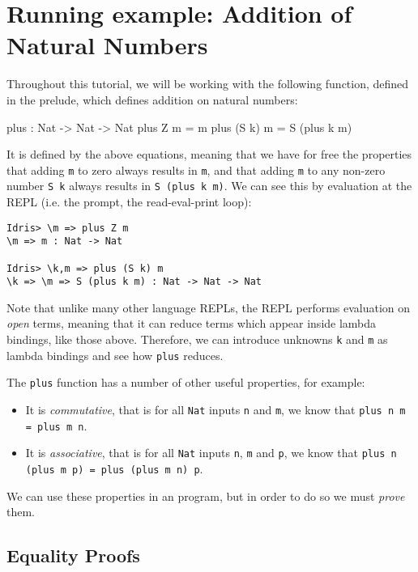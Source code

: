 \section{Running example: Addition of Natural Numbers}

Throughout this tutorial, we will be working with the following function,
defined in the \Idris{} prelude, which defines addition on natural numbers:

\begin{code}
plus : Nat -> Nat -> Nat
plus Z     m = m
plus (S k) m = S (plus k m)
\end{code}

\noindent
It is defined by the above equations, meaning that we have for free the
properties that adding \texttt{m} to zero always results in \texttt{m},
and that adding \texttt{m} to any non-zero number \texttt{S k} always results
in \texttt{S (plus k m)}. We can see this by evaluation at the \Idris{}
REPL (i.e. the prompt, the read-eval-print loop):

\begin{lstlisting}[style=stdout]
Idris> \m => plus Z m
\m => m : Nat -> Nat

Idris> \k,m => plus (S k) m
\k => \m => S (plus k m) : Nat -> Nat -> Nat
\end{lstlisting}

\noindent
Note that unlike many other language REPLs, the \Idris{} REPL performs
evaluation on \emph{open} terms, meaning that it can reduce terms which appear
inside lambda bindings, like those above. Therefore, we can introduce unknowns
\texttt{k} and \texttt{m} as lambda bindings and see how \texttt{plus}
reduces.

The \texttt{plus} function has a number of other useful properties, for
example:

\begin{itemize}
\item It is \emph{commutative}, that is for all \texttt{Nat} inputs
\texttt{n} and \texttt{m}, we know that \texttt{plus n m = plus m n}.
\item It is \emph{associative}, that is for all \texttt{Nat} inputs
\texttt{n}, \texttt{m} and \texttt{p},
we know that \texttt{plus n (plus m p) = plus (plus m n) p}.
\end{itemize}

\noindent
We can use these properties in an \Idris{} program, but in order to do so we
must \emph{prove} them.

\subsection{Equality Proofs}

